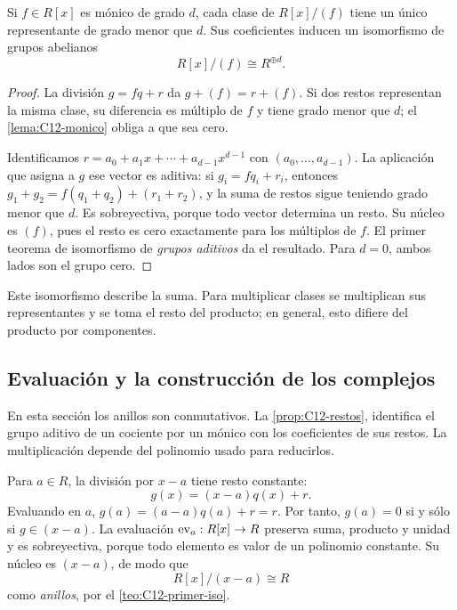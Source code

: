 \begin{prop}\label{prop:C12-restos}
Si $f\in R[x]$ es mónico de grado $d$, cada clase de $R[x]/(f)$ tiene un único representante de grado menor que $d$. Sus coeficientes inducen un isomorfismo de grupos abelianos
\[
R[x]/(f)\cong R^{\oplus d}.
\]
\end{prop}
\begin{proof}
La división $g=fq+r$ da $g+(f)=r+(f)$. Si dos restos representan la misma clase, su diferencia es múltiplo de $f$ y tiene grado menor que $d$; el \cref{lema:C12-monico} obliga a que sea cero.

Identificamos $r=a_0+a_1x+\cdots+a_{d-1}x^{d-1}$ con $(a_0,\ldots,a_{d-1})$. La aplicación que asigna a $g$ ese vector es aditiva: si $g_i=fq_i+r_i$, entonces $g_1+g_2=f(q_1+q_2)+(r_1+r_2)$, y la suma de restos sigue teniendo grado menor que $d$. Es sobreyectiva, porque todo vector determina un resto. Su núcleo es $(f)$, pues el resto es cero exactamente para los múltiplos de $f$. El primer teorema de isomorfismo de \emph{grupos aditivos} da el resultado. Para $d=0$, ambos lados son el grupo cero.
\end{proof}
Este isomorfismo describe la suma. Para multiplicar clases se multiplican sus representantes y se toma el resto del producto; en general, esto difiere del producto por componentes.

\subsection{Evaluación y la construcción de los complejos}\label{tema:13-1-1}
En esta sección los anillos son conmutativos. La \cref{prop:C12-restos}, identifica el grupo aditivo de un cociente por un mónico con los coeficientes de sus restos. La multiplicación depende del polinomio usado para reducirlos.

\begin{ejem}\label{ejem:C13-evaluacion}
Para $a\in R$, la división por $x-a$ tiene resto constante:
\[
g(x)=(x-a)q(x)+r.
\]
Evaluando en $a$, $g(a)=(a-a)q(a)+r=r$. Por tanto, $g(a)=0$ si y sólo si $g\in(x-a)$. La evaluación $\operatorname{ev}_a:R[x]\to R$ preserva suma, producto y unidad y es sobreyectiva, porque todo elemento es valor de un polinomio constante. Su núcleo es $(x-a)$, de modo que
\[
R[x]/(x-a)\cong R
\]
como \emph{anillos}, por el \cref{teo:C12-primer-iso}.
\end{ejem}

